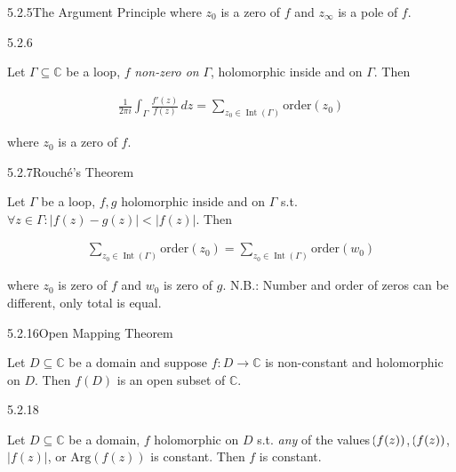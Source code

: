 \documentclass[10pt,landscape]{article}
\let\Re\relax
\DeclareMathOperator{\Re}{Re}
\let\Im\relax
\DeclareMathOperator{\Im}{Im}
\DeclareMathOperator{\Int}{Int}
\begin{document}
\begin{multicols}{3}
\begin{theorem}{5.2.5}{The Argument Principle}
    where $z_0$ is a zero of $f$ and $z_{\infty}$ is a pole of $f$.

\end{theorem}

\begin{corollary}{5.2.6}{}

    Let $\Gamma \subseteq \mathbb{C}$ be a loop, $f$ \emph{non-zero on} $\Gamma$, holomorphic inside and on $\Gamma$. Then

        \begin{align*}
            \frac{1}{2\pi i} \int_{\Gamma} \frac{f'(z)}{f(z)} \,dz = \sum_{z_0 \in \Int\!{(\Gamma)}} \mathrm{order}(z_0)
        \end{align*}

    where $z_0$ is a zero of $f$.

\end{corollary}

\begin{theorem}{5.2.7}{Rouch\'e's Theorem}

    Let $\Gamma$ be a loop, $f,g$ holomorphic inside and on $\Gamma$ s.t. $\forall z \in \Gamma: |f(z) - g(z)| < |f(z)|$. Then 

        \begin{align*}
            \sum_{z_0 \in \Int\!{(\Gamma)}} \mathrm{order}(z_0) = \sum_{z_0 \in \Int\!{(\Gamma)}} \mathrm{order}(w_0)
        \end{align*}

    where $z_0$ is zero of $f$ and $w_0$ is zero of $g$. N.B.: Number and order of zeros can be different, only total is equal.

\end{theorem}

\begin{theorem}{5.2.16}{Open Mapping Theorem}

    Let $D \subseteq \mathbb{C}$ be a domain and suppose $f: D \to \mathbb{C}$ is non-constant and holomorphic on $D$. Then $f(D)$ is an open subset of $\mathbb{C}$.

\end{theorem}

\begin{corollary}{5.2.18}{}

    Let $D \subseteq \mathbb{C}$ be a domain, $f$ holomorphic on $D$ s.t. \emph{any} of the values $\Re\!{(f(z))}$, $\Im\!{(f(z))}$, $|f(z)|$, or $\mathrm{Arg}(f(z))$ is constant. Then $f$ is constant.


\end{corollary}
\end{multicols}
\end{document}

